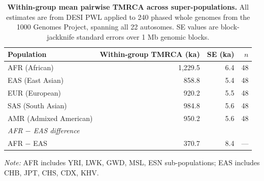 
\begin{table}[htbp]
\centering
\caption{\textbf{Within-group mean pairwise TMRCA across super-populations.}
All estimates are from DESI PWL applied to 240 phased whole genomes from the 1000 Genomes Project, spanning all 22 autosomes. SE values are block-jackknife standard errors over 1 Mb genomic blocks.}
\label{tab:tmrca_means}
\begin{tabular}{lrrr}
\toprule
\textbf{Population} & \textbf{Within-group TMRCA (ka)} & \textbf{SE (ka)} & \textbf{$n$} \\
\midrule
AFR (African)       & 1{,}229.5 & 6.4 & 48 \\
EAS (East Asian)    &   858.8  & 5.4 & 48 \\
EUR (European)      &   920.2  & 5.5 & 48 \\
SAS (South Asian)   &   984.8  & 5.6 & 48 \\
AMR (Admixed American) &  950.2  & 5.6 & 48 \\
\midrule
\multicolumn{4}{l}{\textit{AFR $-$ EAS difference}} \\
\multicolumn{1}{l}{AFR $-$ EAS} & 370.7 & 8.4 & --- \\
\bottomrule
\end{tabular}
\medskip

\noindent\textit{Note:} AFR includes YRI, LWK, GWD, MSL, ESN sub-populations; EAS includes CHB, JPT, CHS, CDX, KHV.
\end{table}
